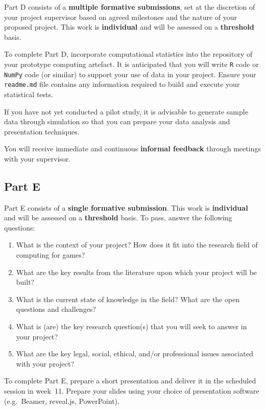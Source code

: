 Part D consists of a \textbf{multiple formative submissions},
set at the discretion of your project supervisor based on agreed milestones and the nature of your proposed project.
This work is \textbf{individual} and will be assessed on a \textbf{threshold} basis.

To complete Part D, incorporate computational statistics into the repository of your prototype computing artefact.
It is anticipated that you will write \texttt{R} code or \texttt{NumPy} code (or similar) to support your use of data in your project.
Ensure your \texttt{readme.md} file contains any information required to build and execute your statistical tests.

If you have not yet conducted a pilot study, it is advisable to generate sample data through simulation so that you can 
prepare your data analysis and presentation techniques.

You will receive immediate and continuous \textbf{informal feedback} through meetings with your supervisor.

\subsection*{Part E}

Part E consists of a \textbf{single formative submission}.
This work is \textbf{individual} and will be assessed on a \textbf{threshold} basis.
To pass, answer the following questions:

\begin{enumerate}[label=(\roman*)]
	\item What is the context of your project? How does it fit into the
		research field of computing for games?
	\item What are the key results from the literature upon which your project will be built?
	\item What is the current state of knowledge in the field?
		What are the open questions and challenges?
	\item What is (are) the key research question(s) that you will seek to
		answer in your project?
	\item What are the key legal, social, ethical, and/or professional issues 
		associated with your project?
\end{enumerate}

To complete Part E, prepare a short presentation 
and deliver it in the scheduled session in week~11.
Prepare your slides using your choice of presentation software
(e.g.\ Beamer, reveal.js, PowerPoint).

